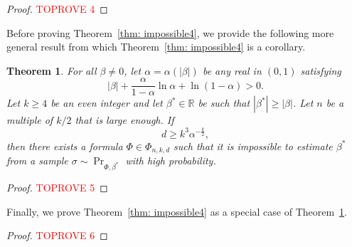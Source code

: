 \documentclass[11pt]{article}
\newtheorem{theorem}{Theorem}[section]
\theoremstyle{definition}
\theoremstyle{remark}
\begin{document}
 
 
\begin{proof}\textcolor{red}{TOPROVE 4}\end{proof}

Before proving Theorem~\ref{thm: impossible4}, we provide the following more general result from which Theorem~\ref{thm: impossible4} is a corollary. 

\begin{theorem}\label{thm: impossible3}
    For all $\beta \neq 0$, 
    let $\alpha=\alpha(|\beta|)$ be any real in $(0,1)$ satisfying
    \begin{equation} \label{eq: alpha def}
        |\beta| + \frac{\alpha}{1-\alpha} \ln{\alpha} + \ln{(1-\alpha)} > 0.
    \end{equation}
    Let  $k \geq 4$ be an even integer and let $\beta^* \in \mathbb{R}$ be such that $|\beta^*|\ge |\beta|$. Let $n$ be a multiple of $k/2$ that is large enough. 
    If
    \begin{equation}\label{eq: alpha bound}
        d \ge k^3 \alpha^{-\frac{k}{2}},
    \end{equation}
    then there exists a formula $\Phi\in \Phi_{n,k,d}$ such that 
    it is impossible to estimate $\beta^*$ from a sample $\sigma \sim \Pr_{\Phi, \beta^*}$ with high probability.
\end{theorem}

 

\begin{proof}\textcolor{red}{TOPROVE 5}\end{proof}
  
Finally, we prove Theorem~\ref{thm: impossible4} as a special case of Theorem~\ref{thm: impossible3}.
\begin{proof}\textcolor{red}{TOPROVE 6}\end{proof}

  
  
 
\end{document}
